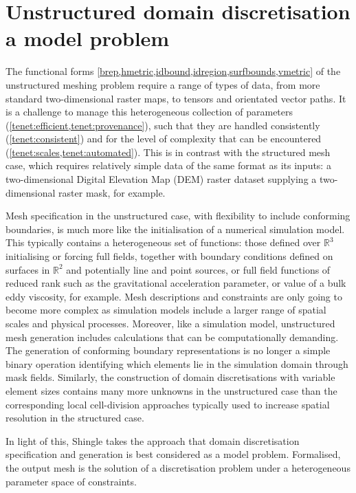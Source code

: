 \documentclass[a4paper, 10pt]{book}
\providecommand{\shingle}{Shingle\xspace}
\providecommand{\twod}{two-dimensional\xspace}
\begin{document}
\section{Unstructured domain discretisation a model problem}
%
The functional forms \cref{brep,hmetric,idbound,idregion,surfbounds,vmetric}
of the unstructured meshing problem
require a range of types of data,
from more standard \twod raster maps, to tensors and orientated vector paths.
%
It is a challenge to manage this heterogeneous collection of parameters (\cref{tenet:efficient,tenet:provenance}),
such that they are handled consistently (\cref{tenet:consistent})
and for the level of complexity that can be encountered (\cref{tenet:scales,tenet:automated}).
%
This is in contrast with the structured mesh case, which requires relatively simple data of the same format as its
inputs:
a \twod Digital Elevation Map (DEM) raster dataset supplying a \twod raster mask, for example.

Mesh specification in the unstructured case,
with flexibility to include conforming boundaries,
is much more like the initialisation of a numerical simulation model.
%
This typically contains a heterogeneous set of functions:
those defined over
$\mathbb{R}^3$ initialising or forcing full fields, together with boundary conditions defined on surfaces in $\mathbb{R}^2$ and
potentially line and point sources, or full field functions of reduced rank such as the gravitational acceleration parameter,
or value of a bulk eddy viscosity, for example.
%
Mesh descriptions and constraints are only going to become more complex as simulation models include a larger range of spatial scales and physical processes.
%
Moreover, like a simulation model, unstructured mesh generation includes calculations that can be computationally demanding.
The generation of conforming boundary representations is no longer a simple binary operation identifying which elements lie in the simulation domain through mask fields.
%
Similarly, the construction of domain discretisations with variable element sizes contains many more unknowns
in the unstructured case than the corresponding
local cell-division approaches typically used to increase spatial resolution in the structured case.

In light of this,
\shingle takes the approach that domain discretisation specification and generation is best considered as a model problem.
%
Formalised, the output mesh is the solution of a discretisation problem under a heterogeneous parameter space of constraints.
\end{document}
